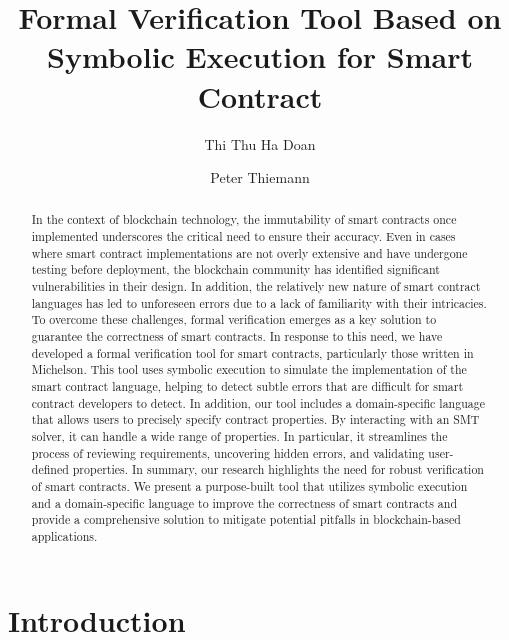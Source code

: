 \documentclass[a4paper,UKenglish]{dagrep-v2021}
\title{Formal Verification Tool Based on Symbolic Execution for Smart Contract}
\author[1]{Thi Thu Ha Doan}
\author[2]{Peter Thiemann}
\affil[1]{University of Freiburg, Germany
  \texttt{doanha@informatik.uni-freiburg.de}}
\affil[2]{University of Freiburg, Germany
  \texttt{thiemann@informatik.uni-freiburg.de}}
\begin{document}
\maketitle

\begin{abstract}
In the context of blockchain technology, the immutability of smart contracts once implemented underscores the critical need to ensure their accuracy. Even in cases where smart contract implementations are not overly extensive and have undergone testing before deployment, the blockchain community has identified significant vulnerabilities in their design. In addition, the relatively new nature of smart contract languages has led to unforeseen errors due to a lack of familiarity with their intricacies. To overcome these challenges, formal verification emerges as a key solution to guarantee the correctness of smart contracts. In response to this need, we have developed a formal verification tool for smart contracts, particularly those written in Michelson. This tool uses symbolic execution to simulate the implementation of the smart contract language, helping to detect subtle errors that are difficult for smart contract developers to detect. In addition, our tool includes a domain-specific language that allows users to precisely specify contract properties. By interacting with an SMT solver, it can handle a wide range of properties. In particular, it streamlines the process of reviewing requirements, uncovering hidden errors, and validating user-defined properties. In summary, our research highlights the need for robust verification of smart contracts. We present a purpose-built tool that utilizes symbolic execution and a domain-specific language to improve the correctness of smart contracts and provide a comprehensive solution to mitigate potential pitfalls in blockchain-based applications.
\end{abstract}


\license




\tableofcontents


\section{Introduction}
\label{sec:introduction}
\end{document}
